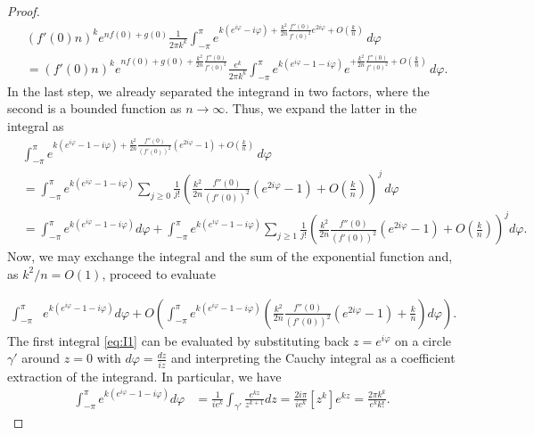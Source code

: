 \documentclass[reqno, 11pt]{amsart}
\theoremstyle{definition}
\theoremstyle{remark}
\numberwithin{equation}{section}
\begin{document}
\begin{proof}
    \begin{align}
        &(f'(0)n)^k  e^{nf(0)+g(0)}\frac{1}{2\pi k^{k}}  
        \int_{-\pi}^\pi  e^{k(e^{i\varphi} - i\varphi) + \frac{k^2}{2n} \frac{f''(0)}{f'(0)^2} e^{2i\varphi} 
         + O\left(\frac{k}{n}\right)} \, d\varphi \nonumber\\
        & = (f'(0)n)^k e^{nf(0)+g(0)+\frac{k^2}{2n} \frac{f''(0)}{f'(0)^2}}  \frac{e^k}{2\pi k^{k}}  
        \int_{-\pi}^\pi  e^{k(e^{i\varphi} - 1 - i\varphi)} 
        e^{+\frac{k^2}{2n} \frac{f''(0)}{f'(0)^2} + O\left(\frac{k}{n}\right)} \, d\varphi. \label{eq:fnk}
    \end{align}
    In the last step, we already separated the integrand in two factors, where the second is a bounded function as $n\rightarrow\infty$. Thus, we expand the latter in the integral as
    \begin{align*}
        &  
        \int_{-\pi}^\pi  e^{k(e^{i\varphi} - 1 - i\varphi) + \frac{k^2}{2n} \frac{f''(0)}{(f'(0))^2}  (e^{2i\varphi} -1) 
        + O(\frac{k}{n})} \, d\varphi \\
        &=   
        \int_{-\pi}^\pi  e^{k(e^{i\varphi} - 1 - i\varphi) }\sum_{j\geq 0} \frac{1}{j!}\left(\frac{k^2}{2n} \frac{f''(0)}{(f'(0))^2}  (e^{2i\varphi} -1) + O\left(\frac{k}{n}\right)\right) ^j\, d\varphi\\
        &=\int_{-\pi}^\pi  e^{k(e^{i\varphi} - 1 - i\varphi)}d\varphi +
        \int_{-\pi}^\pi e^{k(e^{i\varphi} - 1 - i\varphi)}\sum_{j\geq 1}\frac{1}{j!}\left(\frac{k^2}{2n} \frac{f''(0)}{(f'(0))^2}  (e^{2i\varphi} -1) + O\left(\frac{k}{n}\right)\right) ^j d\varphi.
    \end{align*}
    Now, we may exchange the integral and the sum of the exponential function and, as $k^2/n=O(1)$, proceed to evaluate 
    
    \begin{align}\label{eq:I1}
    \int_{-\pi}^\pi  &e^{k(e^{i\varphi} - 1 - i\varphi)}d\varphi +O \left(
        \int_{-\pi}^\pi  e^{k(e^{i\varphi} - 1 - i\varphi)} \left(\frac{k^2}{2n} \frac{f''(0)}{(f'(0))^2} (e^{2i\varphi} -1) + \frac{k}{n}\right)d\varphi\right).
    \end{align}
    The first integral \eqref{eq:I1} can be evaluated by substituting back $z=e^{i\varphi}$ on a circle $\gamma'$ around $z=0$ with $d\varphi = \frac{dz}{iz}$ and interpreting the Cauchy integral as a coefficient extraction of the integrand. In particular, we have
    \begin{align*}
        \int_{-\pi}^\pi  e^{k(e^{i\varphi} - 1 - i\varphi)} d\varphi &= \frac{1}{ie^{k}}\int_{\gamma'}  \frac{e^{kz}}{z^{k+1}}dz = \frac{2i\pi}{ie^{k}}
        [z^k]e^{kz} = \frac{2\pi k^k}{e^{k}k!}
        .
    \end{align*}
 

\end{proof}
\end{document}
